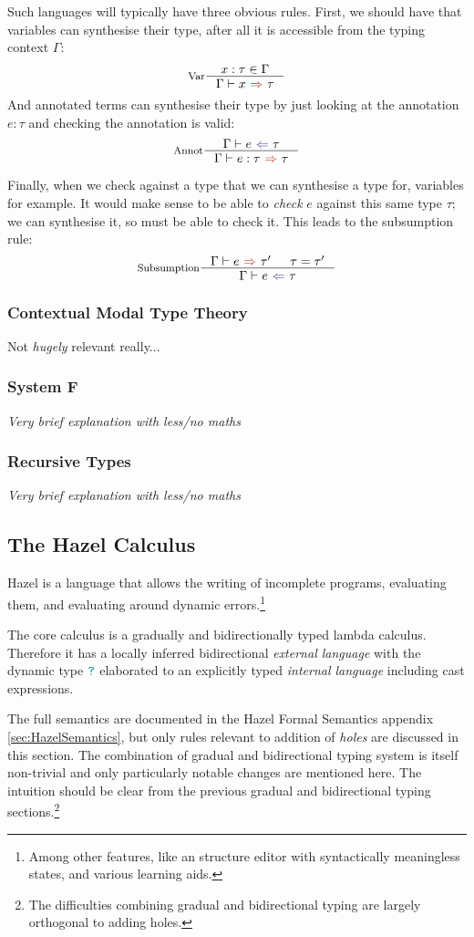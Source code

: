 Such languages will typically have three obvious rules. First, we should have that variables can synthesise their type, after all it is accessible from the typing context $\Gamma$:
\[\inference[Var]{x : \tau \in \Gamma}{\synthesis{x}{\tau}}\]
And annotated terms can synthesise their type by just looking at the annotation $e : \tau$ and checking the annotation is valid:
\[\inference[Annot]{\analysis{e}{\tau}}{\synthesis{e : \tau}{\tau}}\]

Finally, when we check against a type that we can synthesise a type for, variables for example.
It would make sense to be able to \textit{check} $e$ against this same type $\tau$; we can synthesise it, so must be able to check it. This leads to the subsumption rule:
\[\inference[Subsumption]{\synthesis{e}{\tau'} & \tau = \tau'}{\analysis{e}{\tau}}\]

\subsubsection{Contextual Modal Type Theory}
Not \textit{hugely} relevant really...

\subsubsection{System F}
\label{sec:System F}
\textit{Very brief explanation with less/no maths}

\subsubsection{Recursive Types}
\textit{Very brief explanation with less/no maths}

\subsection{The Hazel Calculus}
Hazel is a language that allows the writing of incomplete programs, evaluating them, and evaluating around dynamic errors.\footnote{Among other features, like an structure editor with syntactically meaningless states, and various learning aids.}

The core calculus \cite{HazelLivePaper} is a gradually and bidirectionally typed lambda calculus. Therefore it has a locally inferred bidirectional \textit{external language} with the dynamic type ${\color{teal}\texttt{?}}$ elaborated to an explicitly typed \textit{internal language} including cast expressions. 

The full semantics are documented in the Hazel Formal Semantics appendix \ref{sec:HazelSemantics}, but only rules relevant to addition of \textit{holes} are  discussed in this section. The combination of gradual and bidirectional typing system is itself non-trivial and only particularly notable changes are mentioned here. The intuition should be clear from the previous gradual and bidirectional typing sections.\footnote{The difficulties combining gradual and bidirectional typing are largely orthogonal to adding holes.}

